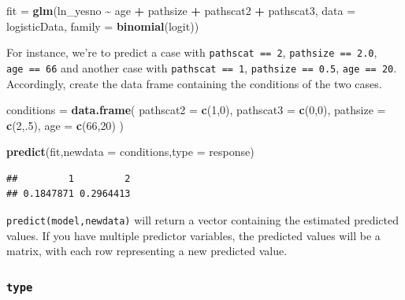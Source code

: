 \documentclass[
]{ctexart}
\newenvironment{Shaded}{\begin{snugshade}}{\end{snugshade}}
\newcommand{\AttributeTok}[1]{\textcolor[rgb]{0.13,0.29,0.53}{#1}}
\newcommand{\DecValTok}[1]{\textcolor[rgb]{0.00,0.00,0.81}{#1}}
\newcommand{\FunctionTok}[1]{\textcolor[rgb]{0.13,0.29,0.53}{\textbf{#1}}}
\newcommand{\NormalTok}[1]{#1}
\newcommand{\OtherTok}[1]{\textcolor[rgb]{0.56,0.35,0.01}{#1}}
\newcommand{\SpecialCharTok}[1]{\textcolor[rgb]{0.81,0.36,0.00}{\textbf{#1}}}
\newcommand{\StringTok}[1]{\textcolor[rgb]{0.31,0.60,0.02}{#1}}
\begin{document}
\begin{Shaded}
\begin{Highlighting}[]
\NormalTok{fit }\OtherTok{=} \FunctionTok{glm}\NormalTok{(ln\_yesno }\SpecialCharTok{\textasciitilde{}}\NormalTok{ age }\SpecialCharTok{+}\NormalTok{ pathsize }\SpecialCharTok{+}\NormalTok{ pathscat2 }\SpecialCharTok{+}\NormalTok{ pathscat3,}
          \AttributeTok{data =}\NormalTok{ logisticData,}
          \AttributeTok{family =} \FunctionTok{binomial}\NormalTok{(}\StringTok{\textquotesingle{}logit\textquotesingle{}}\NormalTok{))}
\end{Highlighting}
\end{Shaded}

For instance, we're to predict a case with \texttt{pathscat\ ==\ 2},
\texttt{pathsize\ ==\ 2.0}, \texttt{age\ ==\ 66} and another case with
\texttt{pathscat\ ==\ 1}, \texttt{pathsize\ ==\ 0.5},
\texttt{age\ ==\ 20}. Accordingly, create the data frame containing the
conditions of the two cases.

\begin{Shaded}
\begin{Highlighting}[]
\NormalTok{conditions }\OtherTok{=} \FunctionTok{data.frame}\NormalTok{(}
  \AttributeTok{pathscat2 =} \FunctionTok{c}\NormalTok{(}\DecValTok{1}\NormalTok{,}\DecValTok{0}\NormalTok{),}
  \AttributeTok{pathscat3 =} \FunctionTok{c}\NormalTok{(}\DecValTok{0}\NormalTok{,}\DecValTok{0}\NormalTok{),}
  \AttributeTok{pathsize =} \FunctionTok{c}\NormalTok{(}\DecValTok{2}\NormalTok{,.}\DecValTok{5}\NormalTok{),}
  \AttributeTok{age =} \FunctionTok{c}\NormalTok{(}\DecValTok{66}\NormalTok{,}\DecValTok{20}\NormalTok{)}
\NormalTok{)}

\FunctionTok{predict}\NormalTok{(fit,}\AttributeTok{newdata =}\NormalTok{ conditions,}\AttributeTok{type =} \StringTok{\textquotesingle{}response\textquotesingle{}}\NormalTok{)}
\end{Highlighting}
\end{Shaded}

\begin{verbatim}
##         1         2 
## 0.1847871 0.2964413
\end{verbatim}

\texttt{predict(model,newdata)} will return a vector containing the
estimated predicted values. If you have multiple predictor variables,
the predicted values will be a matrix, with each row representing a new
predicted value.

\hypertarget{type}{%
\subsubsection{\texorpdfstring{\texttt{type}}{type}}\label{type}}
\end{document}
